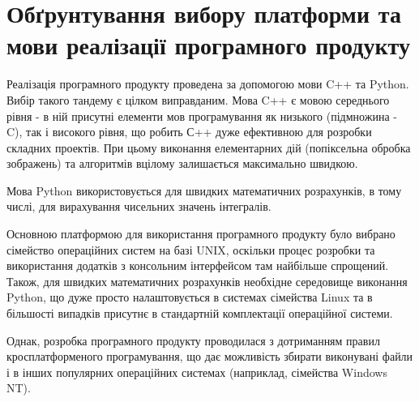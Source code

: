 \section[Вибір платформи і мови реалізації]{Обґрунтування вибору платформи та мови реалізації програмного продукту}

Реалізація програмного продукту проведена за допомогою мови C++ та Python. Вибір такого тандему є цілком виправданим. Мова C++ є мовою середнього рівня - в ній присутні елементи мов програмування як низького (підмножина - C), так і високого рівня, що робить С++ дуже ефективною для розробки складних проектів. При цьому виконання елементарних дій (попіксельна обробка зображень) та алгоритмів вцілому залишається максимально швидкою. 

Мова Python використовується для швидких математичних розрахунків, в тому числі, для вирахування чисельних значень інтегралів.

Основною платформою для використання програмного продукту було вибрано сімейство операційних систем на базі UNIX, оскільки процес розробки та використання додатків з консольним інтерфейсом там найбільше спрощений. Також, для швидких математичних розрахунків необхідне середовище виконання Python, що дуже просто налаштовується в системах сімейства Linux та в більшості випадків присутнє в стандартній комплектації операційної системи.

Однак, розробка програмного продукту проводилася з дотриманням правил кросплатформеного програмування, що дає можливість збирати виконувані файли і в інших популярних операційних системах (наприклад, сімейства Windows NT).
